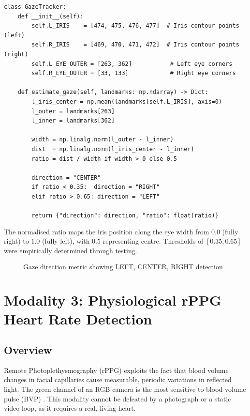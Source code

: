 \documentclass[12pt,a4paper]{report}
\begin{document}
\begin{lstlisting}[style=pythonstyle, caption={Gaze Tracking --- Gaze\_Tracking\_Modality.py}]
class GazeTracker:
    def __init__(self):
        self.L_IRIS    = [474, 475, 476, 477]  # Iris contour points (left)
        self.R_IRIS    = [469, 470, 471, 472]  # Iris contour points (right)
        self.L_EYE_OUTER = [263, 362]           # Left eye corners
        self.R_EYE_OUTER = [33, 133]            # Right eye corners

    def estimate_gaze(self, landmarks: np.ndarray) -> Dict:
        l_iris_center = np.mean(landmarks[self.L_IRIS], axis=0)
        l_outer = landmarks[263]
        l_inner = landmarks[362]

        width = np.linalg.norm(l_outer - l_inner)
        dist  = np.linalg.norm(l_iris_center - l_inner)
        ratio = dist / width if width > 0 else 0.5

        direction = "CENTER"
        if ratio < 0.35:  direction = "RIGHT"
        elif ratio > 0.65: direction = "LEFT"

        return {"direction": direction, "ratio": float(ratio)}
\end{lstlisting}

The normalised ratio maps the iris position along the eye width from $0.0$ (fully right) to $1.0$ (fully left), with $0.5$ representing centre. Thresholds of $[0.35, 0.65]$ were empirically determined through testing.

\begin{figure}[H]
    \centering
    \caption{Gaze direction metric showing LEFT, CENTER, RIGHT detection}
    \label{fig:gaze}
\end{figure}

\chapter{Modality 3: Physiological rPPG Heart Rate Detection}

\section{Overview}
Remote Photoplethysmography (rPPG) exploits the fact that blood volume changes in facial capillaries cause measurable, periodic variations in reflected light. The green channel of an RGB camera is the most sensitive to blood volume pulse (BVP) \cite{verkruysse2008}. This modality cannot be defeated by a photograph or a static video loop, as it requires a real, living heart.
\end{document}
